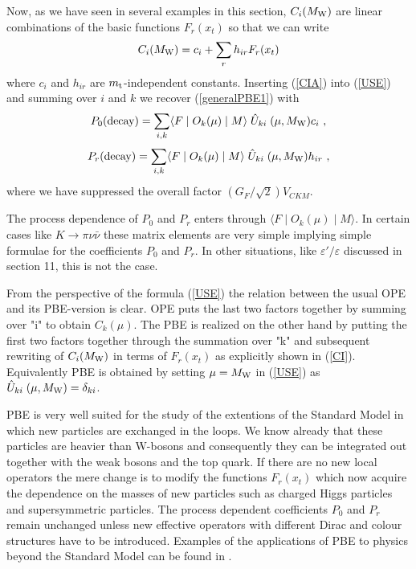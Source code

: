 \documentclass[12pt]{article}
\def\epe{\varepsilon'/\varepsilon}
\newcommand{\mt}{m_{\rm t}}
\newcommand{\mw}{M_{\rm W}}
\newcommand{\be}{\begin{equation}}
\newcommand{\ee}{\end{equation}}
\begin{document}
\begin{itemize}
\begin{itemize}
Now, as we have seen in several examples in this section,
$C_i(\mw)$ are linear combinations of the basic functions
$F_r(x_t)$ so that we can write
\be\label{CIA}
C_i(\mw)=c_i+\sum_r h_{ir} F_r(x_t)
\ee
where $c_i$ and $h_{ir}$ are $\mt$-independent constants. 
Inserting (\ref{CIA})
into (\ref{USE}) and summing over $i$ and $k$ we recover
(\ref{generalPBE1}) with
\be\label{PBE8}
P_0({\rm decay})= \sum_{i,k} \langle F\mid O_k(\mu)\mid M\rangle 
\;\hat U_{ki}\;(\mu,\mw)c_i~,
\ee 
\be\label{PBE9}
P_r({\rm decay})= \sum_{i,k} \langle F\mid O_k(\mu)\mid M\rangle 
\;\hat U_{ki}\;(\mu,\mw)h_{ir}~,
\ee 
where we have suppressed the overall factor $(G_F/\sqrt{2})V_{CKM}$.

The process dependence of $P_0$ and $P_r$ enters through
$\langle F\mid O_k(\mu)\mid M\rangle$. In certain cases like
$K\to\pi\nu\bar\nu$ these matrix elements are very simple implying
simple formulae for the coefficients $P_0$ and $P_r$. In other
situations, like $\epe$ discussed in section 11, this is not the
case.

From the perspective of the formula (\ref{USE}) the relation between
the usual OPE and its PBE-version is clear. OPE puts the last two
factors together by summing over "i" to obtain $C_k(\mu)$. The
PBE is realized on the other hand by putting the first two factors
together through the summation over "k" and subsequent rewriting
of $C_i(\mw)$ in terms of $F_r(x_t)$ as explicitly shown in
(\ref{CI}). Equivalently PBE is obtained by setting $\mu=\mw$
in (\ref{USE}) as $\hat U_{ki}\;(\mu,\mw)=\delta_{ki}$.

PBE is very well suited for the study of the extentions of the
Standard Model in which new particles are exchanged in the loops.
We know already that these particles are heavier than W-bosons
and consequently they can be integrated out together with
the weak bosons and the top quark. If there are no new local operators
the mere change is to modify the functions $F_r(x_t)$ which now
acquire the dependence on the masses of new particles such as
charged Higgs particles and supersymmetric particles. The process
dependent coefficients $P_0$ and $P_r$ remain unchanged unless
new effective operators with different Dirac and colour structures
have to be introduced. Examples of the applications of PBE to physics
beyond the Standard Model can be found in \cite{BBHLS,MW96,AAA}.


\end{itemize}
\end{itemize}
\end{document}
